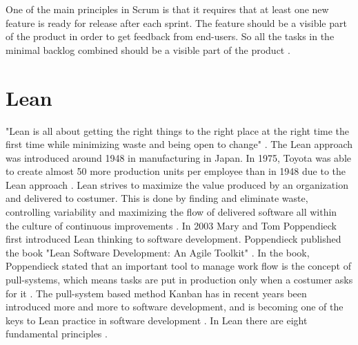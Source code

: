 \documentclass[UKenglish]{ifimaster}  %
\begin{document}
One of the main principles in Scrum is that it requires that at least one new feature is ready for release after each sprint. The feature should be a visible part of the product in order to get feedback from end-users. So all the tasks in the minimal backlog combined should be a visible part of the product \parencite{Scrum}.


\section {Lean}
\label{sec:Lean}
"Lean is all about getting the right things to the right place at the right time the first time while minimizing waste and being open to change" \parencite{741480}.
The Lean approach was introduced around 1948 in manufacturing in Japan.  In 1975, Toyota was able to create almost 50 more production units per employee than in 1948 due to the Lean approach \parencite{manning}. Lean strives to maximize the value produced by an organization and delivered to costumer. This is done by finding and eliminate waste, controlling variability and maximizing the flow of delivered software all within the culture of continuous improvements \parencite{DavidAnderson}. In 2003 Mary and Tom Poppendieck first introduced Lean thinking to software development. Poppendieck published the book "Lean Software Development: An Agile Toolkit" \parencite{Lean:2003}. In the book, Poppendieck stated that an important tool to manage work flow is the concept of pull-systems, which means tasks are put in production only when a costumer asks for it \parencite{Lean:2009}.
The pull-system based method Kanban has in recent years been introduced more and more to software development, and is becoming one of the keys to Lean practice in software development \parencite{DavidAnderson}. In Lean there are eight fundamental principles \parencite{poppendieck2003lean}.
\end{document}
